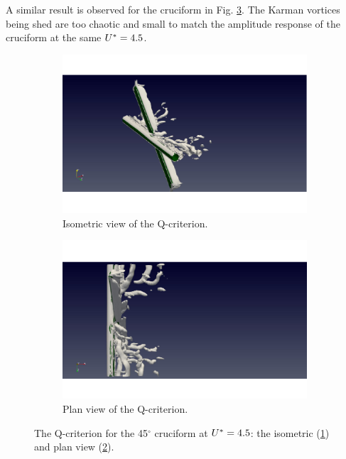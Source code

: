 \documentclass[oneside]{utmthesis}
\begin{document}
A similar result is observed for the \angth{} cruciform in Fig. \ref{fig:qCrit045U02}. The Karman vortices being shed are too chaotic and small to match the amplitude response of the \angfo{} cruciform at the same $U^{*}=4.5$.
\begin{figure}[H]
  \centering
  \begin{subfigure}[h]{0.48\textwidth}
    \includegraphics[width=\textwidth,trim={1.5cm 0 3cm 0},clip]{figs/qIso045U02}
    \caption{Isometric view of the Q-criterion.}
    \label{fig:qIso045U02}
  \end{subfigure}
  \hfill
  \begin{subfigure}[h]{0.48\textwidth}
    \includegraphics[width=\textwidth,trim={1.5cm 0 3cm 0},clip]{figs/qTop045U02}
    \caption{Plan view of the Q-criterion.}
    \label{fig:qTop045U02}
  \end{subfigure}

  \caption{The Q-criterion for the 45$^{\circ}$ cruciform at $U^{*} = 4.5$: the isometric (\ref{fig:qIso045U02}) and plan view (\ref{fig:qTop045U02}).} \label{fig:qCrit045U02}
\end{figure}
\end{document}
